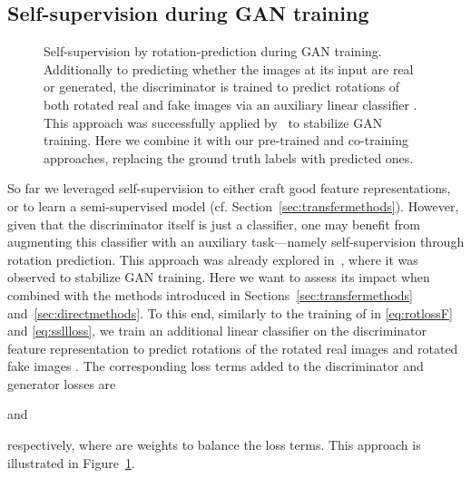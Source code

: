 \documentclass{article}
\begin{document}
\subsection{Self-supervision during GAN training}\label{sec:selfsup}
\begin{figure}[t!]
\centering
{}
\caption{Self-supervision by rotation-prediction during GAN training. Additionally to predicting whether the images at its input are real or generated, the discriminator is trained to predict rotations of both rotated real and fake images via an auxiliary linear classifier . This approach was successfully applied by~\citet{chen2019self} to stabilize GAN training. Here we combine it with our pre-trained and co-training approaches, replacing the ground truth labels  with predicted ones.\label{fig:ssgan}}
\vspace{-0.2cm}
\end{figure}
So far we leveraged self-supervision to either craft good feature representations, or to learn a semi-supervised model (cf. Section~\ref{sec:transfermethods}). However, given that the discriminator itself is just a classifier, one may benefit from augmenting this classifier with an auxiliary task---namely self-supervision through rotation prediction. This approach was already explored in~\citet{chen2019self}, where it was observed to stabilize GAN training. Here we want to assess its impact when combined with the methods introduced in Sections~\ref{sec:transfermethods} and~\ref{sec:directmethods}. To this end, similarly to the training of  in \eqref{eq:rotlossF} and \eqref{eq:ssllloss}, we train an additional linear classifier  on the discriminator feature representation  to predict rotations  of the rotated real images  and rotated fake images . The corresponding loss terms added to the discriminator and generator losses are

and

respectively, where  are weights to balance the loss terms. This approach is illustrated in Figure~\ref{fig:ssgan}.
\end{document}

